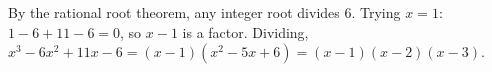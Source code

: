 By the rational root theorem, any integer root divides $6$. Trying $x=1$: $1-6+11-6=0$, so $x-1$ is a factor. Dividing, $x^3-6x^2+11x-6=(x-1)(x^2-5x+6)=\boxed{(x-1)(x-2)(x-3)}$.
